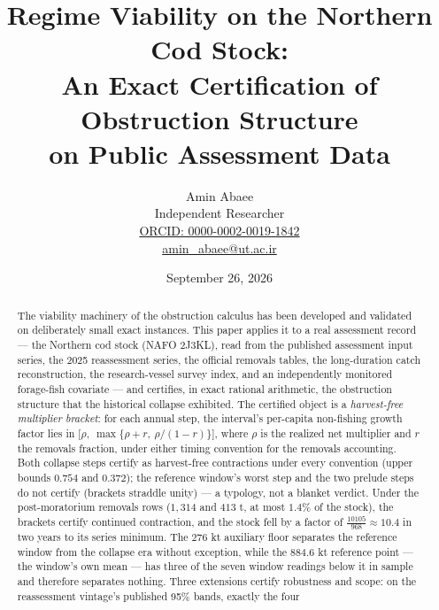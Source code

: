 \documentclass[10pt,twocolumn]{article}
\theoremstyle{plain}
\theoremstyle{remark}
\begin{document}
\title{Regime Viability on the Northern Cod Stock:\\
An Exact Certification of Obstruction Structure\\
on Public Assessment Data}
\author{Amin Abaee\\[0.35em]
{\small Independent Researcher}\\[0.55em]
{\small\href{https://orcid.org/0000-0002-0019-1842}{ORCID: 0000-0002-0019-1842}}\\[0.3em]
{\small\href{mailto:amin\_abaee@ut.ac.ir}{amin\_abaee@ut.ac.ir}}}
\date{September 26, 2026}
\maketitle

\begin{abstract}
The viability machinery of the obstruction calculus has been developed
and validated on deliberately small exact instances. This paper applies
it to a real assessment record --- the Northern cod stock (NAFO 2J3KL),
read from the published assessment input series, the 2025 reassessment
series, the official removals tables, the long-duration catch
reconstruction, the research-vessel survey index, and an independently
monitored forage-fish covariate --- and certifies, in exact rational
arithmetic, the obstruction structure that the historical collapse
exhibited. The certified object is a \emph{harvest-free multiplier
bracket}: for each annual step, the interval's per-capita non-fishing
growth factor lies in
\(\bigl[\rho,\ \max\{\rho+r,\ \rho/(1-r)\}\bigr]\), where \(\rho\) is
the realized net multiplier and \(r\) the removals fraction, under
either timing convention for the removals accounting. Both collapse
steps certify as harvest-free contractions under every convention
(upper bounds \(0.754\) and \(0.372\)); the reference window's worst
step and the two prelude steps do not certify (brackets straddle
unity) --- a typology, not a blanket verdict. Under the post-moratorium
removals rows (\(1{,}314\) and \(413\) t, at most \(1.4\%\) of the
stock), the brackets certify continued contraction, and the stock fell
by a factor of \(\tfrac{10105}{968} \approx 10.4\) in two years to its
series minimum. The \(276\) kt auxiliary floor separates the reference
window from the collapse era without exception, while the
\(884.6\) kt reference point --- the window's own mean --- has three of
the seven window readings below it in sample and therefore separates
nothing. Three extensions certify robustness and scope: on the
reassessment vintage's published 95\% bands, exactly the four

\end{abstract}
\end{document}
